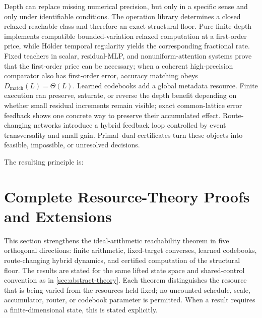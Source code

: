 \documentclass[twoside,11pt]{article}
\begin{document}
Depth can replace missing numerical precision, but only in a specific sense and only under identifiable conditions.  The operation library determines a closed relaxed reachable class and therefore an exact structural floor.  Pure finite depth implements compatible bounded-variation relaxed computation at a first-order price, while H\"older temporal regularity yields the corresponding fractional rate.  Fixed teachers in scalar, residual-MLP, and nonuniform-attention systems prove that the first-order price can be necessary; when a coherent high-precision comparator also has first-order error, accuracy matching obeys $D_{\mathrm{match}}(L)=\Theta(L)$.  Learned codebooks add a global metadata resource.  Finite execution can preserve, saturate, or reverse the depth benefit depending on whether small residual increments remain visible; exact common-lattice error feedback shows one concrete way to preserve their accumulated effect.  Route-changing networks introduce a hybrid feedback loop controlled by event transversality and small gain.  Primal--dual certificates turn these objects into feasible, impossible, or unresolved decisions.

The resulting principle is:
\begin{center}
\end{center}


\appendix

\section{Complete Resource-Theory Proofs and Extensions}
\label{app:full-resource-proofs}
\label{app:resource-theory-proofs}
\label{sec:resource-theory-candidate}

This section strengthens the ideal-arithmetic reachability theorem in five
orthogonal directions: finite arithmetic, fixed-target converses, learned
codebooks, route-changing hybrid dynamics, and certified computation of the
structural floor.  The results are stated for the same lifted state space and
shared-control convention as in \cref{sec:abstract-theory}.  Each theorem
distinguishes the resource that is being varied from the resources held fixed;
no uncounted schedule, scale, accumulator, router, or codebook parameter is
permitted.  When a result requires a finite-dimensional state, this is stated
explicitly.
\end{document}
